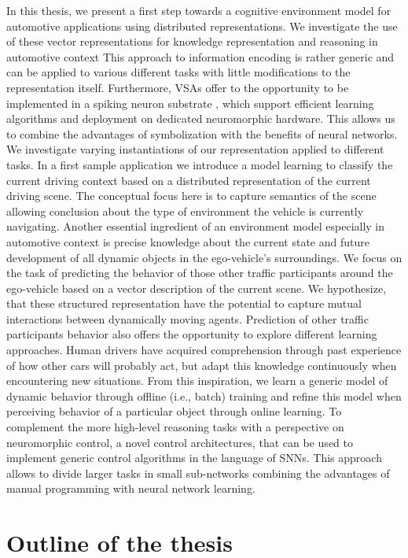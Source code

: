In this thesis, we present a first step towards a cognitive environment model for automotive applications using distributed representations.
We investigate the use of these vector representations for knowledge representation and reasoning in automotive context 
This approach to information encoding is rather generic and can be applied to various different tasks with little modifications to the representation itself.
Furthermore, \acp{VSA} offer to the opportunity to be implemented in a spiking neuron substrate \cite{Eliasmith2013}, which support efficient learning algorithms and deployment on dedicated neuromorphic hardware.
This allows us to combine the advantages of symbolization with the benefits of neural networks.
We investigate varying instantiations of our representation applied to different tasks.
In a first sample application we introduce a model learning to classify the current driving context based on a distributed representation of the current driving scene. 
The conceptual focus here is to capture semantics of the scene allowing conclusion about the type of environment the vehicle is currently navigating.
Another essential ingredient of an environment model especially in automotive context is precise knowledge about the current state and future development of all dynamic objects in the ego-vehicle's surroundings.
We focus on the task of predicting the behavior of those other traffic participants around the ego-vehicle based on a vector description of the current scene.
We hypothesize, that these structured representation have the potential to capture mutual interactions between dynamically moving agents.
Prediction of other traffic participants behavior also offers the opportunity to explore different learning approaches.
Human drivers have acquired comprehension through past experience of how other cars will probably act, but adapt this knowledge continuously when encountering new situations.
From this inspiration, we learn a generic model of dynamic behavior through offline (i.e., batch) training and refine this model when perceiving behavior of a particular object through online learning.
To complement the more high-level reasoning tasks with a perspective on neuromorphic control, a novel control architectures, that can be used to implement generic control algorithms in the language of \acp{SNN}.
This approach allows to divide larger tasks in small sub-networks combining the advantages of manual programming with neural network learning.

\section{Outline of the thesis}%
\label{sec:outline_of_the_thesis}

